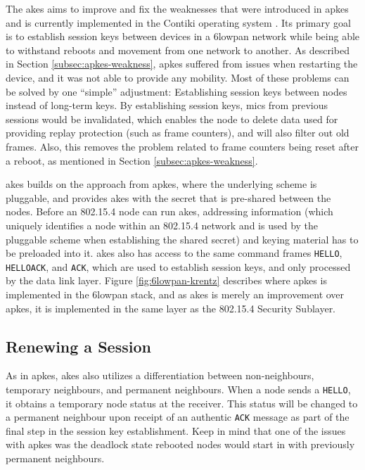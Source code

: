 The \gls{akes} aims to improve and fix the weaknesses that were introduced in \gls{apkes} and is currently implemented in the Contiki operating system \cite{krentz2015handling}. Its primary goal is to establish session keys between devices in a \gls{6lowpan} network while being able to withstand reboots and movement from one network to another. As described in Section \ref{subsec:apkes-weakness}, \gls{apkes} suffered from issues when restarting the device, and it was not able to provide any mobility. Most of these problems can be solved by one ``simple'' adjustment: Establishing session keys between nodes instead of long-term keys. By establishing session keys, \gls{mic}s from previous sessions would be invalidated, which enables the node to delete data used for providing replay protection (such as frame counters), and will also filter out old frames. Also, this removes the problem related to frame counters being reset after a reboot, as mentioned in Section \ref{subsec:apkes-weakness}. 

\gls{akes} builds on the approach from \gls{apkes}, where the underlying scheme is pluggable, and provides \gls{akes} with the secret that is pre-shared between the nodes. Before an 802.15.4 node can run \gls{akes}, addressing information (which uniquely identifies a node within an 802.15.4 network and is used by the pluggable scheme when establishing the shared secret) and keying material has to be preloaded into it. \gls{akes} also has access to the same command frames \texttt{HELLO}, \texttt{HELLOACK}, and \texttt{ACK}, which are used to establish session keys, and only processed by the data link layer. Figure \ref{fig:6lowpan-krentz} describes where \gls{apkes} is implemented in the \gls{6lowpan} stack, and as \gls{akes} is merely an improvement over \gls{apkes}, it is implemented in the same layer as the 802.15.4 Security Sublayer. 

\subsection{Renewing a Session}

As in \gls{apkes}, \gls{akes} also utilizes a differentiation between non-neighbours, temporary neighbours, and permanent neighbours. When a node sends a \texttt{HELLO}, it obtains a temporary node status at the receiver. This status will be changed to a permanent neighbour upon receipt of an authentic \texttt{ACK} message as part of the final step in the session key establishment. Keep in mind that one of the issues with \gls{apkes} was the deadlock state rebooted nodes would start in with previously permanent neighbours.

